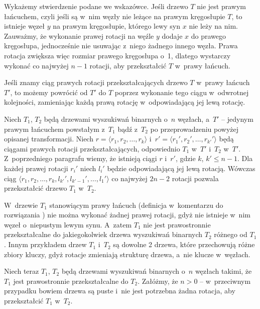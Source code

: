 \noindent Wykażemy stwierdzenie podane we wskazówce.
Jeśli drzewo $T$ nie jest prawym łańcuchem, czyli jeśli są w~nim węzły nie leżące na prawym kręgosłupie $T$, to istnieje węzeł $y$ na prawym kręgosłupie, którego lewy syn $x$ nie leży na nim.
Zauważmy, że wykonanie prawej rotacji na węźle $y$ dodaje $x$ do prawego kręgosłupa, jednocześnie nie usuwając z~niego żadnego innego węzła.
Prawa rotacja zwiększa więc rozmiar prawego kręgosłupa o~1, dlatego wystarczy wykonać co najwyżej $n-1$ rotacji, aby przekształcić $T$ w~prawy łańcuch.

Jeśli znamy ciąg prawych rotacji przekształcających drzewo $T$ w~prawy łańcuch $T'$, to możemy powrócić od $T'$ do $T$ poprzez wykonanie tego ciągu w~odwrotnej kolejności, zamieniając każdą prawą rotację w~odpowiadającą jej lewą rotację.

Niech $T_1$, $T_2$ będą drzewami wyszukiwań binarnych o~$n$ węzłach, a~$T'$ -- jedynym prawym łańcuchem powstałym z~$T_1$ bądź z~$T_2$ po przeprowadzeniu powyżej opisanej transformacji.
Niech $r=\langle r_1,r_2,\dots,r_k\rangle$ i~$r'=\langle r_1',r_2',\dots,r_{k'}'\rangle$ będą ciągami prawych rotacji przekształcających, odpowiednio $T_1$ w~$T'$ i~$T_2$ w~$T'$.
Z~poprzedniego paragrafu wiemy, że istnieją ciągi $r$ i~$r'$, gdzie $k$, $k'\le n-1$.
Dla każdej prawej rotacji $r_i'$ niech $l_i'$ będzie odpowiadającą jej lewą rotacją.
Wówczas ciąg $\langle r_1,r_2,\dots,r_k,l_{k'}',l_{k'-1}',\dots,l_1'\rangle$ co najwyżej $2n-2$ rotacji pozwala przekształcić drzewo $T_1$ w~$T_2$.

\exercise %

\noindent W~drzewie $T_1$ stanowiącym prawy łańcuch (definicja w~komentarzu do rozwiązania ) nie można wykonać żadnej prawej rotacji, gdyż nie istnieje w~nim węzeł o~niepustym lewym synu.
A~zatem $T_1$ nie jest prawostronnie przekształcalne do jakiegokolwiek drzewa wyszukiwań binarnych $T_2$ różnego od $T_1$.
Innym przykładem drzew $T_1$ i~$T_2$ są dowolne 2 drzewa, które przechowują różne zbiory kluczy, gdyż rotacje zmieniają strukturę drzewa, a~nie klucze w~węzłach.

Niech teraz $T_1$, $T_2$ będą drzewami wyszukiwań binarnych o~$n$ węzłach takimi, że $T_1$ jest prawostronnie przekształcalne do $T_2$.
Załóżmy, że $n>0$ -- w~przeciwnym przypadku bowiem drzewa są puste i~nie jest potrzebna żadna rotacja, aby przekształcić $T_1$ w~$T_2$.

